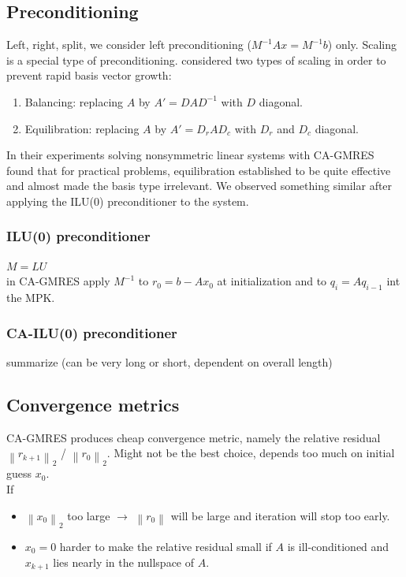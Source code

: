 \documentclass{scrartcl}
\newcommand{\norm}[1]{\left\lVert#1\right\rVert}
\begin{document}
\subsection{Preconditioning}
Left, right, split, we consider left preconditioning ($M^{-1}Ax = M^{-1}b$) only.
Scaling is a special type of preconditioning. \cite{Hoemmen:2010:CKS:1970638} considered two types of scaling in order to prevent rapid basis vector growth:
\begin{enumerate}
\item Balancing: replacing $A$ by $A' = DAD^{-1}$ with $D$ diagonal.
\item Equilibration: replacing $A$ by $A' = D_rAD_c$ with $D_r$ and $D_c$ diagonal.
\end{enumerate}
In their experiments solving nonsymmetric linear systems with CA-GMRES \cite{Hoemmen:2010:CKS:1970638} found that for practical problems, equilibration established to be quite effective and almost made the basis type irrelevant. We observed something similar after applying the ILU(0) preconditioner to the system.
\subsubsection{ILU(0) preconditioner}
$M = LU$ \\
in CA-GMRES apply $M^{-1}$ to $r_0 = b - Ax_0$ at initialization and to $ q_i = Aq_{i-1}$ int the MPK.
\subsubsection{CA-ILU(0) preconditioner}
summarize \cite{Grigori} (can be very long or short, dependent on overall length)
\subsection{Convergence metrics}
CA-GMRES produces cheap convergence metric, namely the relative residual $\norm{r_{k+1}}_2$ / $\norm{r_0}_2$. Might not be the best choice, depends too much on initial guess $x_0$.\\

If 
\begin{itemize}
\item $\norm{x_0}_2$ too large $\rightarrow$ $\norm{r_0}$ will be large and iteration will stop too early.
\item $x_0 = 0$ harder to make the relative residual small if $A$ is ill-conditioned and $x_{k+1}$ lies nearly in the nullspace of $A$.
\end{itemize}
\end{document}
